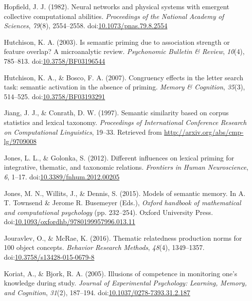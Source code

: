 \documentclass[english,man]{apa6}
\theoremstyle{definition}
\theoremstyle{definition}
\theoremstyle{definition}
\theoremstyle{remark}
\begin{document}
\hypertarget{ref-Hopfield1982}{}
Hopfield, J. J. (1982). Neural networks and physical systems with
emergent collective computational abilities. \emph{Proceedings of the
National Academy of Sciences}, \emph{79}(8), 2554--2558.
doi:\href{https://doi.org/10.1073/pnas.79.8.2554}{10.1073/pnas.79.8.2554}

\hypertarget{ref-Hutchison2003}{}
Hutchison, K. A. (2003). Is semantic priming due to association strength
or feature overlap? A microanalytic review. \emph{Psychonomic Bulletin
\& Review}, \emph{10}(4), 785--813.
doi:\href{https://doi.org/10.3758/BF03196544}{10.3758/BF03196544}

\hypertarget{ref-Hutchison2007}{}
Hutchison, K. A., \& Bosco, F. A. (2007). Congruency effects in the
letter search task: semantic activation in the absence of priming.
\emph{Memory \& Cognition}, \emph{35}(3), 514--525.
doi:\href{https://doi.org/10.3758/BF03193291}{10.3758/BF03193291}

\hypertarget{ref-Jiang1997}{}
Jiang, J. J., \& Conrath, D. W. (1997). Semantic similarity based on
corpus statistics and lexical taxonomy. \emph{Proceedings of
International Conference Research on Computational Linguistics}, 19--33.
Retrieved from \url{http://arxiv.org/abs/cmp-lg/9709008}

\hypertarget{ref-Jones2012}{}
Jones, L. L., \& Golonka, S. (2012). Different influences on lexical
priming for integrative, thematic, and taxonomic relations.
\emph{Frontiers in Human Neuroscience}, \emph{6}, 1--17.
doi:\href{https://doi.org/10.3389/fnhum.2012.00205}{10.3389/fnhum.2012.00205}

\hypertarget{ref-Jones2015}{}
Jones, M. N., Willits, J., \& Dennis, S. (2015). Models of semantic
memory. In A. T. Townsend \& Jerome R. Busemeyer (Eds.), \emph{Oxford
handbook of mathematical and computational psychology} (pp. 232--254).
Oxford University Press.
doi:\href{https://doi.org/10.1093/oxfordhb/9780199957996.013.11}{10.1093/oxfordhb/9780199957996.013.11}

\hypertarget{ref-Jouravlev2016}{}
Jouravlev, O., \& McRae, K. (2016). Thematic relatedness production
norms for 100 object concepts. \emph{Behavior Research Methods},
\emph{48}(4), 1349--1357.
doi:\href{https://doi.org/10.3758/s13428-015-0679-8}{10.3758/s13428-015-0679-8}

\hypertarget{ref-Koriat2005}{}
Koriat, A., \& Bjork, R. A. (2005). Illusions of competence in
monitoring one's knowledge during study. \emph{Journal of Experimental
Psychology: Learning, Memory, and Cognition}, \emph{31}(2), 187--194.
doi:\href{https://doi.org/10.1037/0278-7393.31.2.187}{10.1037/0278-7393.31.2.187}
\end{document}
